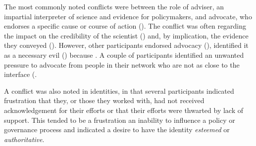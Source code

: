 The most commonly noted conflicts were between the role of adviser, an impartial interpreter of science and evidence for policymakers, and advocate, who endorses a specific cause or course of action (). The conflict was often regarding the impact on the credibility of the scientist () and, by implication, the evidence they conveyed (). However, other participants endorsed advocacy (), identified it as a necessary evil () because . A couple of participants identified an unwanted pressure to advocate from people in their network who are not as close to the interface (.

A conflict was also noted in identities, in that several participants indicated frustration that they, or those they worked with, had not received acknowledgement for their efforts or that their efforts were thwarted by lack of support. This tended to be a frustration an inability to influence a policy or governance process and indicated a desire to have the identity \emph{esteemed} or \emph{authoritative}.



